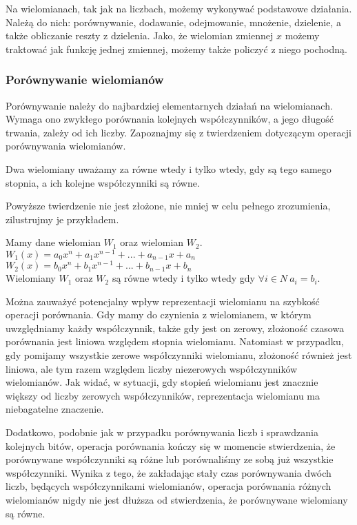 Na wielomianach, tak jak na liczbach, możemy wykonywać podstawowe działania. Należą do nich: porównywanie, dodawanie, odejmowanie, mnożenie, dzielenie, a także obliczanie reszty z dzielenia. Jako, że wielomian zmiennej $x$ możemy traktować jak funkcję jednej zmiennej, możemy także policzyć z niego pochodną.

\subsubsection{Porównywanie wielomianów}
Porównywanie należy do najbardziej elementarnych działań na wielomianach. Wymaga ono zwykłego porównania kolejnych współczynników, a jego długość trwania, zależy od ich liczby. Zapoznajmy się z twierdzeniem dotyczącym operacji porównywania wielomianów.

\begin{theorem}
	$ $\\
	Dwa wielomiany uważamy za równe wtedy i tylko wtedy, gdy są tego samego stopnia, a ich kolejne współczynniki są równe.
\end{theorem}

Powyższe twierdzenie nie jest złożone, nie mniej w celu pełnego zrozumienia, zilustrujmy je przykładem. 

\begin{example}
	$ $\\
	Mamy dane wielomian $W_1$ oraz wielomian $W_2$. \\
	$W_1(x) = a_0x^n + a_1x^{n-1} + ... + a_{n-1}x + a_n$ \\
	$W_2(x) = b_0x^n + b_1x^{n-1} + ... + b_{n-1}x + b_n$ \\
	Wielomiany $W_1$ oraz $W_2 $ są równe wtedy i tylko wtedy gdy
	$\forall{i\in N}\ a_i = b_i$.
\end{example}

Można zauważyć potencjalny wpływ reprezentacji wielomianu na szybkość operacji porównania. Gdy mamy do czynienia z wielomianem, w którym uwzględniamy każdy współczynnik, także gdy jest on zerowy, złożoność czasowa porównania jest liniowa względem stopnia wielomianu. Natomiast w przypadku, gdy pomijamy wszystkie zerowe współczynniki wielomianu, złożoność również jest liniowa, ale tym razem względem liczby niezerowych współczynników wielomianów. Jak widać, w sytuacji, gdy stopień wielomianu jest znacznie większy od liczby zerowych współczynników, reprezentacja wielomianu ma niebagatelne znaczenie.

Dodatkowo, podobnie jak w przypadku porównywania liczb i sprawdzania kolejnych bitów, operacja porównania kończy się w momencie stwierdzenia, że porównywane współczynniki są różne lub porównaliśmy ze sobą już wszystkie współczynniki. Wynika z tego, że zakładając stały czas porównywania dwóch liczb, będących współczynnikami wielomianów, operacja porównania różnych wielomianów nigdy nie jest dłuższa od stwierdzenia, że porównywane wielomiany są równe.

